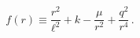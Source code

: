 \begin{equation}f(r)\equiv \frac{r^2}{\ell^2}+k-\frac{\mu}{r^2}+
\frac{q^2}{r^4}\,.
\end{equation} 
